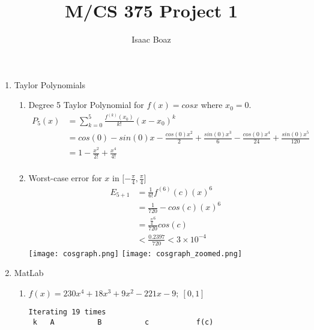 \documentclass{article}
\title{\vspace{-5ex}M/CS 375 Project 1}
\author{Isaac Boaz}
\begin{document}
\maketitle

\begin{enumerate}
    \item Taylor Polynomials
          \begin{enumerate}[label=(\alph*)]
              \item Degree 5 Taylor Polynomial for \(f(x) = cos x\) where \(x_0 = 0\).
                    \begin{align*}
                        P_5(x) & = \sum_{k=0}^5 \frac{f^{(k)}(x_0)}{k!}(x-x_0)^k                                                               \\
                               & = cos(0) - sin(0)x - \frac{cos(0)x^2}{2} + \frac{sin(0)x^3}{6} - \frac{cos(0)x^4}{24} + \frac{sin(0)x^5}{120} \\
                               & = 1 - \frac{x^2}{2!} + \frac{x^4}{4!}                                                                         \\
                    \end{align*}
              \item Worst-case error for \(x\) in \(\lbrack -\frac{\pi}{4}, \frac{\pi}{4}\rbrack\)
                    \begin{align*}
                        E_{5+1} & = \frac{1}{6!}f^{(6)}(c)(x)^6           \\
                                & = \frac{1}{720} -cos(c)(x)^6            \\
                                & = \frac{\frac{\pi}{4}^6}{720}cos(c)     \\
                                & < \frac{0.2397}{720} < 3 \times 10^{-4}
                    \end{align*}
                    \texttt{[image: cosgraph.png]}
                    \texttt{[image: cosgraph\_zoomed.png]}
          \end{enumerate}
    \item MatLab
          \lstset{language=MatLab,basicstyle=\small\ttfamily}
          \begin{enumerate}[label=(\alph*)]
            \item \(f(x) = 230x^4 + 18x^3 + 9x^2 - 221x - 9;\ [0, 1]\)
\begin{lstlisting}
Iterating 19 times
 k   A          B          c           f(c)

\end{lstlisting}
\end{enumerate}
\end{enumerate}
\end{document}

